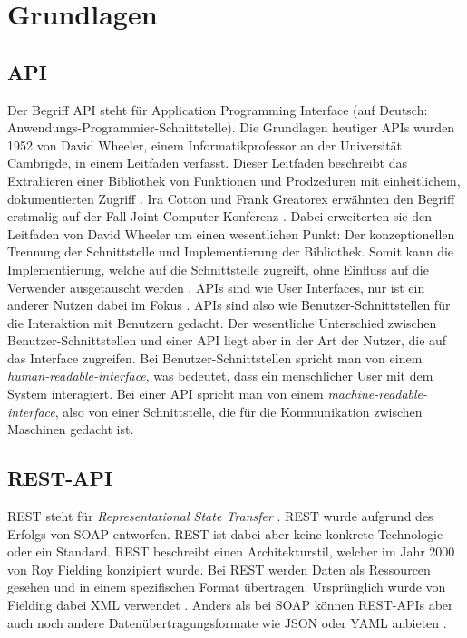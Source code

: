 \chapter{Grundlagen}
\section{API}

Der Begriff API steht für Application Programming Interface (auf Deutsch: Anwendungs-Programmier-Schnittstelle).
Die Grundlagen heutiger APIs wurden 1952 von David Wheeler, einem Informatikprofessor an der Universität Cambrigde, in einem Leitfaden verfasst.
Dieser Leitfaden beschreibt das Extrahieren einer Bibliothek von Funktionen und Prodzeduren mit einheitlichem, dokumentierten Zugriff \cite[S.5-6]{wheeler1952use}.
Ira Cotton und Frank Greatorex erwähnten den Begriff erstmalig auf der Fall Joint Computer Konferenz \cite[S.5]{cotton1968data}.
Dabei erweiterten sie den Leitfaden von David Wheeler um einen wesentlichen Punkt: Der konzeptionellen Trennung der Schnittstelle und Implementierung der Bibliothek.
Somit kann die Implementierung, welche auf die Schnittstelle zugreift, ohne Einfluss auf die Verwender ausgetauscht werden \cite[S.2]{kress2020graphql}.
APIs sind wie User Interfaces, nur ist ein anderer Nutzen dabei im Fokus \cite[S.5]{berlind2017apis}.
APIs sind also wie Benutzer-Schnittstellen für die Interaktion mit Benutzern gedacht.
Der wesentliche Unterschied zwischen Benutzer-Schnittstellen und einer API liegt aber in der Art der Nutzer, die auf das Interface zugreifen.
Bei Benutzer-Schnittstellen spricht man von einem \textit{human-readable-interface}, was bedeutet, dass ein menschlicher User mit dem System interagiert.
Bei einer API spricht man von einem \textit{machine-readable-interface}, also von einer Schnittstelle, die für die Kommunikation zwischen Maschinen gedacht ist.

\section{REST-API}
REST steht für \textit{Representational State Transfer} \cite[S.235-236]{wheeler1952use}.
REST wurde aufgrund des Erfolgs von SOAP entworfen. \cite[Abs. REST APIs]{graphcms}
REST ist dabei aber keine konkrete Technologie oder ein Standard.
REST beschreibt einen Architekturstil, welcher im Jahr 2000 von Roy Fielding konzipiert wurde.
Bei REST werden Daten als Ressourcen gesehen und in einem spezifischen Format übertragen.
Ursprünglich wurde von Fielding dabei XML verwendet \cite[S.11]{kress2020graphql}.
Anders als bei SOAP können REST-APIs aber auch noch andere Datenübertragungsformate wie JSON oder YAML anbieten \cite[Abs. REST APIs]{graphcms}.
\newline

